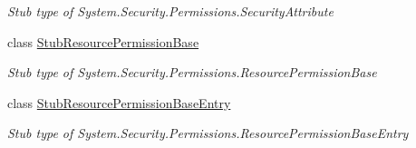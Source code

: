 \begin{DoxyCompactItemize}
\begin{DoxyCompactList}\small\item\em Stub type of System.\-Security.\-Permissions.\-Security\-Attribute\end{DoxyCompactList}\item 
class \hyperlink{class_system_1_1_security_1_1_permissions_1_1_fakes_1_1_stub_resource_permission_base}{Stub\-Resource\-Permission\-Base}
\begin{DoxyCompactList}\small\item\em Stub type of System.\-Security.\-Permissions.\-Resource\-Permission\-Base\end{DoxyCompactList}\item 
class \hyperlink{class_system_1_1_security_1_1_permissions_1_1_fakes_1_1_stub_resource_permission_base_entry}{Stub\-Resource\-Permission\-Base\-Entry}
\begin{DoxyCompactList}\small\item\em Stub type of System.\-Security.\-Permissions.\-Resource\-Permission\-Base\-Entry\end{DoxyCompactList}\end{DoxyCompactItemize}
